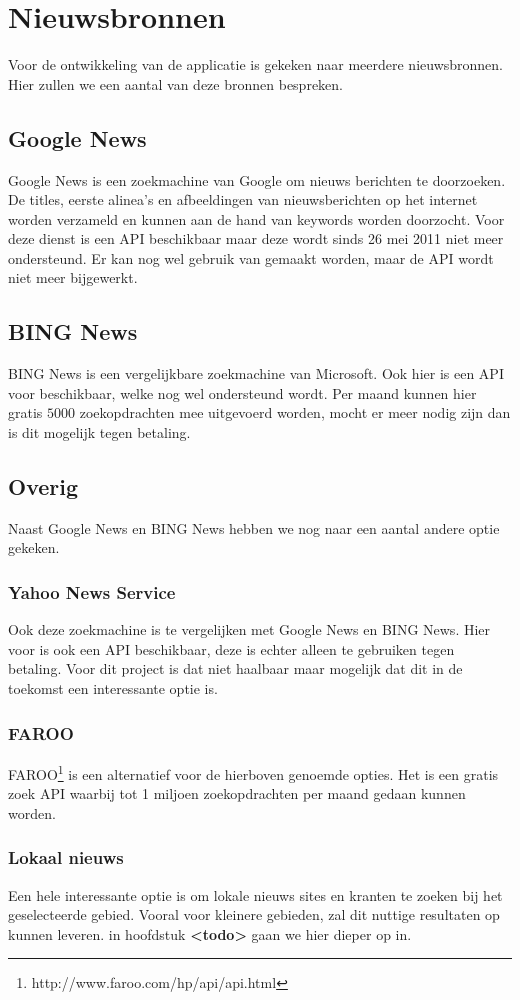 \documentclass[twoside,openright]{uva-bachelor-thesis}
\begin{document}
	\section{Nieuwsbronnen}
		Voor de ontwikkeling van de applicatie is gekeken naar meerdere nieuwsbronnen. Hier zullen we een aantal van deze bronnen bespreken.
		\subsection{Google News}
			Google News is een zoekmachine van Google om nieuws berichten te doorzoeken. De titles, eerste alinea's en afbeeldingen van nieuwsberichten op het internet worden verzameld en kunnen aan de hand van keywords worden doorzocht. Voor deze dienst is een API beschikbaar maar deze wordt sinds 26 mei 2011 niet meer ondersteund. Er kan nog wel gebruik van gemaakt worden, maar de API wordt niet meer bijgewerkt. 
		\subsection{BING News}
			BING News is een vergelijkbare zoekmachine van Microsoft. Ook hier is een API voor beschikbaar, welke nog wel ondersteund wordt. Per maand kunnen hier gratis $5000$ zoekopdrachten mee uitgevoerd worden, mocht er meer nodig zijn dan is dit mogelijk tegen betaling.
		\subsection{Overig}
			Naast Google News en BING News hebben we nog naar een aantal andere optie gekeken.
			\subsubsection{Yahoo News Service}
				Ook deze zoekmachine is te vergelijken met Google News en BING News. Hier voor is ook een API beschikbaar, deze is echter alleen te gebruiken tegen betaling. Voor dit project is dat niet haalbaar maar mogelijk dat dit in de toekomst een interessante optie is.
			\subsubsection{FAROO}
				FAROO\footnote{http://www.faroo.com/hp/api/api.html} is een alternatief voor de hierboven genoemde opties. Het is een gratis zoek API waarbij tot 1 miljoen zoekopdrachten per maand gedaan kunnen worden. 
			\subsubsection{Lokaal nieuws}
				Een hele interessante optie is om lokale nieuws sites en kranten te zoeken bij het geselecteerde gebied. Vooral voor kleinere gebieden, zal dit nuttige resultaten op kunnen leveren. in hoofdstuk \textbf{<todo>} gaan we hier dieper op in.
\end{document}
